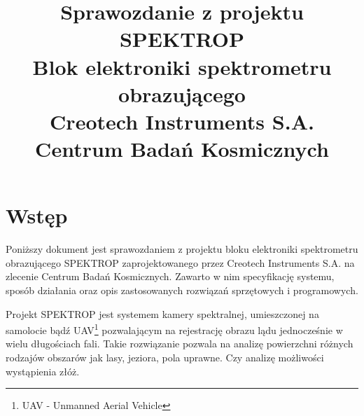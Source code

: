 \documentclass[a4paper,11pt,oneside]{book}  %
\title{Sprawozdanie z projektu SPEKTROP\\ Blok elektroniki spektrometru obrazującego \\[10pt] \large{Creotech Instruments S.A.} \\ \large{Centrum Badań Kosmicznych}}
\begin{document}
%





\maketitle



\lstset{escapechar=@,style=custom}

\chapter{Wstęp} 
Poniższy dokument jest sprawozdaniem z projektu bloku elektroniki spektrometru obrazującego SPEKTROP zaprojektowanego przez Creotech Instruments S.A. na zlecenie Centrum Badań Kosmicznych. Zawarto w nim specyfikację systemu, sposób działania oraz opis zastosowanych rozwiązań sprzętowych i programowych. 

Projekt SPEKTROP jest systemem kamery spektralnej, umieszczonej na samolocie bądź UAV\footnote{UAV - Unmanned Aerial Vehicle} pozwalającym na rejestrację obrazu lądu jednocześnie w wielu długościach fali.
Takie rozwiązanie pozwala na analizę powierzchni różnych rodzajów obszarów jak lasy, jeziora, pola uprawne. Czy analizę możliwości wystąpienia złóż.
\end{document}
